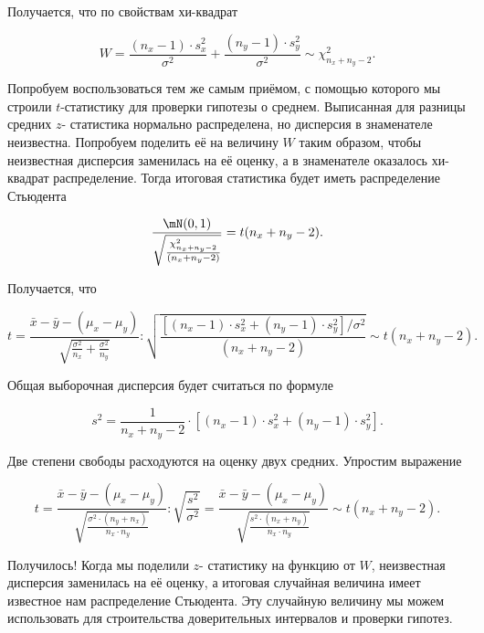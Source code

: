 \documentclass[12pt, a4paper, oneside]{article}
\begin{document}
Получается, что по свойствам хи-квадрат

$$
W = \frac{(n_x - 1) \cdot s_x^2}{\sigma^2}  + \frac{(n_y - 1) \cdot s_y^2}{\sigma^2} \sim \chi^2_{n_x + n_y - 2}. 
$$

Попробуем воспользоваться тем же самым приёмом, с помощью которого мы строили $t$-статистику для проверки гипотезы о среднем. Выписанная для разницы средних $z$- статистика нормально распределена, но дисперсия в знаменателе неизвестна. Попробуем поделить её на величину $W$ таким образом, чтобы неизвестная дисперсия заменилась на её оценку, а в знаменателе оказалось хи-квадрат распределение. Тогда итоговая статистика будет иметь распределение Стьюдента

\begin{equation*} 
\frac{\mN(0,1)}{ \sqrt{\frac{\chi^2_{n_x + n_y - 2}}{ (n_x + n_y - 2)}}} = t(n_x + n_y - 2).
\end{equation*} 

Получается, что

\begin{equation*} 
t = \frac{\bar{x} - \bar{y} - (\mu_x - \mu_y)}{\sqrt{\frac{\sigma^2}{n_x} + \frac{\sigma^2}{n_y}}} : \sqrt{ \frac{ [(n_x - 1) \cdot s_x^2 + (n_y - 1) \cdot s_y^2] / \sigma^2} {(n_x + n_y - 2)}} \sim t(n_x + n_y - 2).
\end{equation*} 

Общая выборочная дисперсия будет считаться по формуле 

$$
s^2 = \frac{1}{n_x + n_y - 2} \cdot \left[ (n_x - 1) \cdot s_x^2 + (n_y - 1) \cdot s_y^2 \right]. 
$$

Две степени свободы расходуются на оценку двух средних. Упростим выражение 

\begin{equation*} 
t = \frac{\bar{x} - \bar{y} - (\mu_x - \mu_y)}{\sqrt{\frac{\sigma^2 \cdot (n_y + n_x)}{n_x \cdot n_y}}} : \sqrt{ \frac{s^2} {\sigma^2}} =  \frac{\bar{x} - \bar{y} - (\mu_x - \mu_y)}{\sqrt{\frac{s^2 \cdot (n_x + n_y)}{n_x \cdot  n_y}}} \sim t(n_x + n_y - 2).
\end{equation*} 

Получилось! Когда мы поделили $z$- статистику на функцию от $W$, неизвестная дисперсия заменилась на её оценку, а итоговая случайная величина имеет известное нам распределение Стьюдента. Эту случайную величину мы можем использовать для строительства доверительных интервалов и проверки гипотез. 



\end{document}
